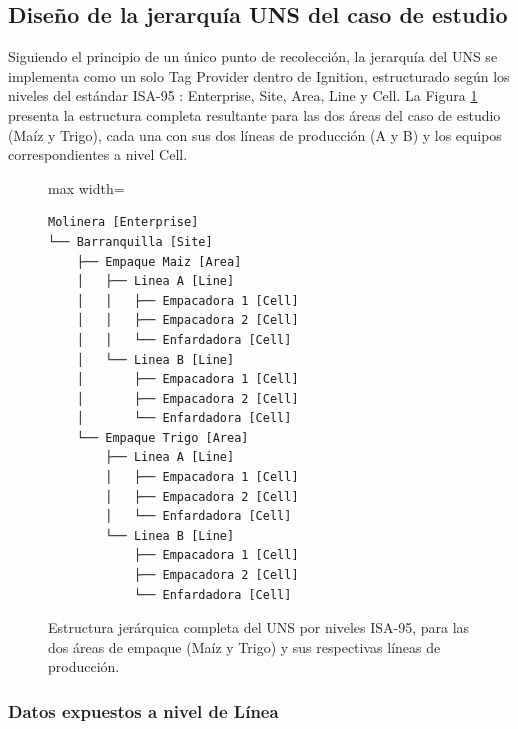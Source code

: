 \subsection{Diseño de la jerarquía UNS del caso de estudio}
\label{sec:diseno_jerarquia}

Siguiendo el principio de un único punto de recolección, la jerarquía del UNS se implementa como un solo Tag Provider dentro de Ignition, estructurado según los niveles del estándar ISA-95 \cite{johnsson2004isa, johnsson2021beyond}: Enterprise, Site, Area, Line y Cell. La Figura \ref{fig:uns_estructura} presenta la estructura completa resultante para las dos áreas del caso de estudio (Maíz y Trigo), cada una con sus dos líneas de producción (A y B) y los equipos correspondientes a nivel Cell.

\begin{figure}[H]
\centering
\begin{adjustbox}{max width=\columnwidth}
\begin{BVerbatim}
Molinera [Enterprise]
└── Barranquilla [Site]
    ├── Empaque Maiz [Area]
    │   ├── Linea A [Line]
    │   │   ├── Empacadora 1 [Cell]
    │   │   ├── Empacadora 2 [Cell]
    │   │   └── Enfardadora [Cell]
    │   └── Linea B [Line]
    │       ├── Empacadora 1 [Cell]
    │       ├── Empacadora 2 [Cell]
    │       └── Enfardadora [Cell]
    └── Empaque Trigo [Area]
        ├── Linea A [Line]
        │   ├── Empacadora 1 [Cell]
        │   ├── Empacadora 2 [Cell]
        │   └── Enfardadora [Cell]
        └── Linea B [Line]
            ├── Empacadora 1 [Cell]
            ├── Empacadora 2 [Cell]
            └── Enfardadora [Cell]
\end{BVerbatim}
\end{adjustbox}
\caption{Estructura jerárquica completa del UNS por niveles ISA-95,
para las dos áreas de empaque (Maíz y Trigo) y sus respectivas
líneas de producción.}
\label{fig:uns_estructura}
\end{figure}

\subsubsection{Datos expuestos a nivel de Línea}

